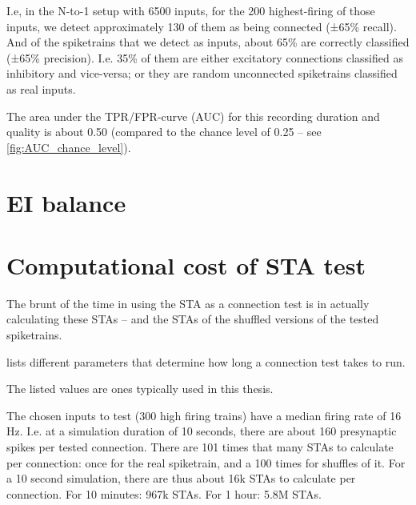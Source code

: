 I.e, in the N-to-1 setup with 6500 inputs, for the 200 highest-firing of those inputs, we detect approximately 130 of them as being connected (±65\% recall). And of the spiketrains that we detect as inputs, about 65\% are correctly classified  (±65\% precision). I.e. 35\% of them are either excitatory connections classified as inhibitory and vice-versa; or they are random unconnected spiketrains classified as real inputs.

The area under the TPR/FPR-curve (AUC) for this recording duration and quality is about 0.50 (compared to the chance level of 0.25 -- see \cref{fig:AUC_chance_level}).


\section{EI balance}




\section{Computational cost of STA test}

The brunt of the time in using the STA as a connection test is in actually calculating these STAs -- and the STAs of the shuffled versions of the tested spiketrains.

 lists different parameters that determine how long a connection test takes to run.

\begin{table}
    
    {The listed values are ones typically used in this thesis.}
    \label{tab:conntest-time-factors}
\end{table}


The chosen inputs to test (300 high firing trains) have a median firing rate of 16 Hz. I.e. at a simulation duration of 10 seconds, there are about 160 presynaptic spikes per tested connection. There are 101 times that many STAs to calculate per connection: once for the real spiketrain, and a 100 times for shuffles of it. For a 10 second simulation, there are thus about 16k STAs to calculate per connection.
For 10 minutes: 967k STAs. For 1 hour: 5.8M STAs.

